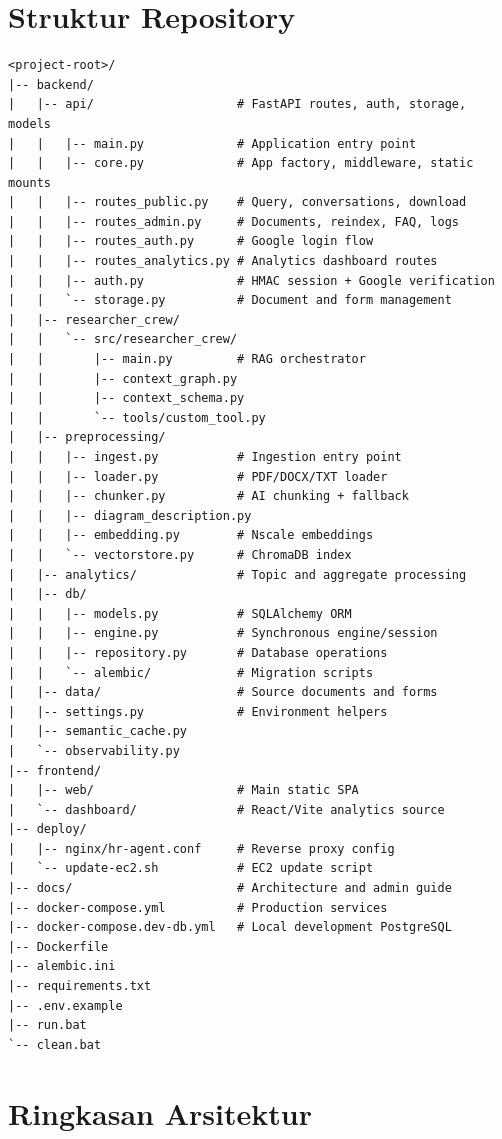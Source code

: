 \documentclass[11pt,a4paper]{article}
\begin{document}
\section{Struktur Repository}
\begin{lstlisting}[basicstyle=\ttfamily\scriptsize]
<project-root>/
|-- backend/
|   |-- api/                    # FastAPI routes, auth, storage, models
|   |   |-- main.py             # Application entry point
|   |   |-- core.py             # App factory, middleware, static mounts
|   |   |-- routes_public.py    # Query, conversations, download
|   |   |-- routes_admin.py     # Documents, reindex, FAQ, logs
|   |   |-- routes_auth.py      # Google login flow
|   |   |-- routes_analytics.py # Analytics dashboard routes
|   |   |-- auth.py             # HMAC session + Google verification
|   |   `-- storage.py          # Document and form management
|   |-- researcher_crew/
|   |   `-- src/researcher_crew/
|   |       |-- main.py         # RAG orchestrator
|   |       |-- context_graph.py
|   |       |-- context_schema.py
|   |       `-- tools/custom_tool.py
|   |-- preprocessing/
|   |   |-- ingest.py           # Ingestion entry point
|   |   |-- loader.py           # PDF/DOCX/TXT loader
|   |   |-- chunker.py          # AI chunking + fallback
|   |   |-- diagram_description.py
|   |   |-- embedding.py        # Nscale embeddings
|   |   `-- vectorstore.py      # ChromaDB index
|   |-- analytics/              # Topic and aggregate processing
|   |-- db/
|   |   |-- models.py           # SQLAlchemy ORM
|   |   |-- engine.py           # Synchronous engine/session
|   |   |-- repository.py       # Database operations
|   |   `-- alembic/            # Migration scripts
|   |-- data/                   # Source documents and forms
|   |-- settings.py             # Environment helpers
|   |-- semantic_cache.py
|   `-- observability.py
|-- frontend/
|   |-- web/                    # Main static SPA
|   `-- dashboard/              # React/Vite analytics source
|-- deploy/
|   |-- nginx/hr-agent.conf     # Reverse proxy config
|   `-- update-ec2.sh           # EC2 update script
|-- docs/                       # Architecture and admin guide
|-- docker-compose.yml          # Production services
|-- docker-compose.dev-db.yml   # Local development PostgreSQL
|-- Dockerfile
|-- alembic.ini
|-- requirements.txt
|-- .env.example
|-- run.bat
`-- clean.bat
\end{lstlisting}

\newpage
\section{Ringkasan Arsitektur}
\end{document}
